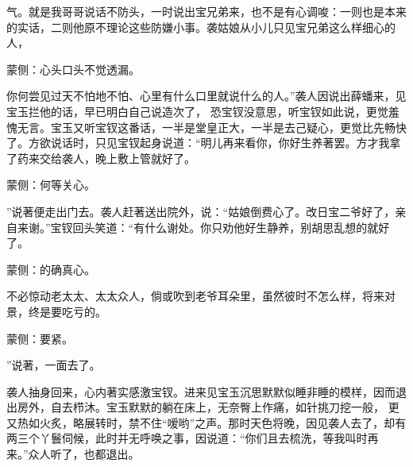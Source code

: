\begin{parag}
气。就是我哥哥说话不防头，一时说出宝兄弟来，也不是有心调唆：一则也是本来的实话，二则他原不理论这些防嫌小事。袭姑娘从小儿只见宝兄弟这么样细心的人，\begin{note}蒙侧：心头口头不觉透漏。\end{note}你何尝见过天不怕地不怕、心里有什么口里就说什么的人。”袭人因说出薛蟠来，见宝玉拦他的话，早已明白自己说造次了， 恐宝钗没意思，听宝钗如此说，更觉羞愧无言。宝玉又听宝钗这番话，一半是堂皇正大，一半是去己疑心，更觉比先畅快了。方欲说话时，只见宝钗起身说道：“明儿再来看你，你好生养著罢。方才我拿了药来交给袭人，晚上敷上管就好了。\begin{note}蒙侧：何等关心。\end{note}”说著便走出门去。袭人赶著送出院外，说：“姑娘倒费心了。改日宝二爷好了，亲自来谢。”宝钗回头笑道：“有什么谢处。你只劝他好生静养，别胡思乱想的就好了。\begin{note}蒙侧：的确真心。\end{note}不必惊动老太太、太太众人，倘或吹到老爷耳朵里，虽然彼时不怎么样，将来对景，终是要吃亏的。\begin{note}蒙侧：要紧。\end{note}”说著，一面去了。
\end{parag}


\begin{parag}
    袭人抽身回来，心内著实感激宝钗。进来见宝玉沉思默默似睡非睡的模样，因而退出房外，自去栉沐。宝玉默默的躺在床上，无奈臀上作痛，如针挑刀挖一般， 更又热如火炙，略展转时，禁不住“嗳哟”之声。那时天色将晚，因见袭人去了，却有两三个丫鬟伺候，此时并无呼唤之事，因说道：“你们且去梳洗，等我叫时再来。”众人听了，也都退出。
\end{parag}


